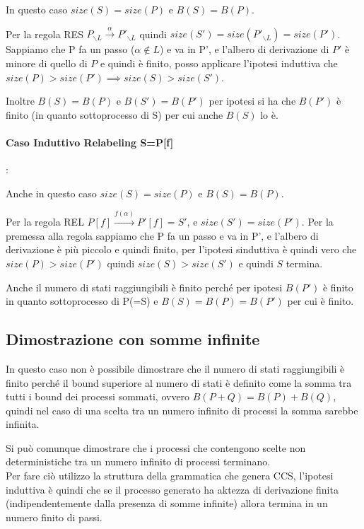 \documentclass{article}
\newcommand{\pl}{P_{\backslash L}}
\newcommand{\pil}{P'_{\backslash L}}
\newcommand{\passo}{\xrightarrow{\alpha}}
\newcommand{\passof}{\xrightarrow{f(\alpha)}}
\begin{document}
In questo caso $size(S) = size(P)$ e $B(S)=B(P)$. 

Per la regola RES $\pl \passo \pil$ quindi $size(S')= size(\pil) =size(P')$. Sappiamo che P fa un passo ($\alpha \not\in L$) e va in P', e l'albero di derivazione di $P'$ è minore di quello di $P$ e quindi è finito, posso applicare l'ipotesi induttiva che $size(P)>size(P') \implies size(S)>size(S')$. 

Inoltre $B(S) =B(P)$ e $B(S') =B(P')$ per ipotesi si ha che $B(P')$ è finito (in quanto sottoprocesso di S) per cui anche $B(S)$ lo è.

\paragraph{Caso Induttivo Relabeling S=P[f]}:


Anche in questo caso $ size(S) = size(P) $ e $ B(S)=B(P) $. 

Per la regola REL $P[f] \passof P'[f] =S'$, e $size(S') = size(P') $. Per la premessa alla regola sappiamo che P fa un passo e va in P', e l'albero di derivazione è più piccolo e quindi finito, per l'ipotesi sinduttiva è quindi vero che $size(P)>size(P')$  quindi $size(S)>size(S')$ e quindi $S$ termina.

Anche il numero di stati raggiungibili è finito perché per ipotesi $B(P')$ è finito in quanto sottoprocesso di P(=S) e $B(S)=B(P)=B(P')$ per cui è finito.



\subsection{Dimostrazione con somme infinite}

In questo caso non è possibile dimostrare che il numero di stati raggiungibili è finito perché il bound superiore al numero di stati è definito come la somma tra tutti i bound dei processi sommati, ovvero $B(P+Q)=B(P)+B(Q)$, quindi nel caso di una scelta tra un numero infinito di processi la somma sarebbe infinita.

Si può comunque dimostrare che i processi che contengono scelte non deterministiche tra un numero infinito di processi terminano.\\

Per fare ciò utilizzo la struttura della grammatica che genera CCS,
l'ipotesi induttiva è quindi che se il processo generato ha aktezza di derivazione finita (indipendentemente dalla presenza di somme infinite) allora termina in un numero finito di passi.
\end{document}
